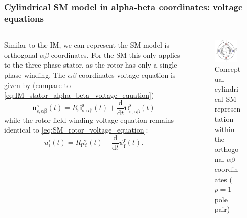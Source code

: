 \begin{frame}
	\frametitle{Cylindrical SM model in alpha-beta coordinates: voltage equations}
    \begin{columns}
		\begin{column}{0.55\textwidth}
	       Similar to the IM, we can represent the SM model is orthogonal $\alpha\beta$-coordinates. For the SM this only applies to the three-phase stator, as the rotor has only a single phase winding. The $\alpha\beta$-coordinates voltage equation is given by (compare to \eqref{eq:IM_stator_alpha_beta_voltage_equation})
		   \begin{equation}
			\bm{u}^\mathrm{s}_\mathrm{s,\alpha\beta}(t) = R_\mathrm{s} \bm{i}^\mathrm{s}_\mathrm{s,\alpha\beta}(t)+ \frac{\mathrm{d}}{\mathrm{d}t}\bm{\psi}^\mathrm{s}_\mathrm{s,\alpha\beta}(t)
		   \end{equation}
		   \onslide<2->
		   while the rotor field winding voltage equation remains identical to \eqref{eq:SM_rotor_voltage_equation}:
		   $$
			u^\mathrm{r}_\mathrm{f}(t) = R_\mathrm{f}i^\mathrm{r}_\mathrm{f}(t)+\frac{\mathrm{d}}{\mathrm{d}t}\psi^\mathrm{r}_\mathrm{f}(t).
			$$
        \end{column}
        \begin{column}{0.45\textwidth}
            \begin{figure}
                \centering
                \includegraphics[width=0.85\textwidth]{fig/lec07/SM_cylindrical_rotor_alpha_beta.pdf}
                \caption{Conceptual cylindrical SM representation within the orthogonal $\alpha\beta$ coordinates ($p=1$ pole pair)}
                \label{fig:SM_alpha_beta}
            \end{figure}
        \end{column}
    \end{columns}
\end{frame}


